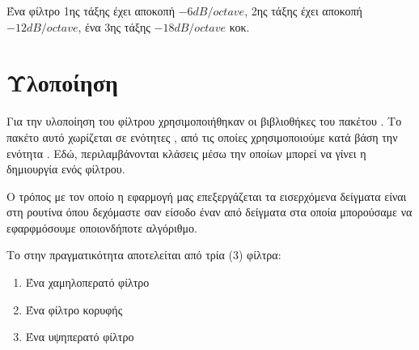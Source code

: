 \documentclass[12pt]{extarticle}
\begin{document}
Ένα φίλτρο  1ης τάξης έχει αποκοπή $-6dB/octave$, 2ης τάξης έχει αποκοπή $-12dB/octave$, ένα 3ης τάξης $-18dB/octave$ κοκ.

\section{Υλοποίηση}

Για την υλοποίηση του φίλτρου χρησιμοποιήθηκαν οι βιβλιοθήκες του πακέτου 
. Το πακέτο αυτό χωρίζεται σε ενότητες , από τις οποίες
χρησιμοποιούμε κατά βάση την ενότητα . 
Εδώ, περιλαμβάνονται κλάσεις μέσω την οποίων μπορεί να γίνει η δημιουργία 
ενός φίλτρου.

Ο τρόπος με τον οποίο η εφαρμογή μας επεξεργάζεται τα εισερχόμενα δείγματα
 είναι στη ρουτίνα  όπου δεχόμαστε σαν είσοδο έναν
 από δείγματα στα οποία μπορούσαμε να εφαρφμόσουμε οποιονδήποτε αλγόριθμο. 

Το  στην πραγματικότητα αποτελείται από τρία (3) φίλτρα: 

\begin{enumerate}
    \item Ένα χαμηλοπερατό φίλτρο 
    \item Ένα φίλτρο κορυφής
    \item Ένα υψηπερατό φίλτρο
\end{enumerate}
\end{document}
